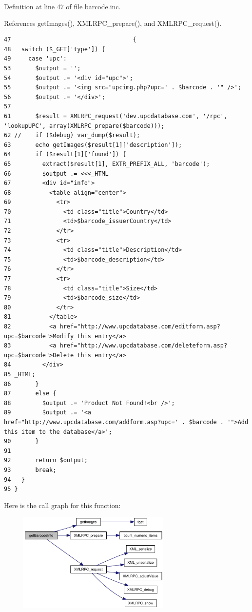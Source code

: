 Definition at line 47 of file barcode.inc.

References getImages(), XMLRPC\_\-prepare(), and XMLRPC\_\-request().

\begin{Code}\begin{verbatim}47                                   {
48   switch ($_GET['type']) {
49     case 'upc':
53       $output = '';
54       $output .= '<div id="upc">';
55       $output .= '<img src="upcimg.php?upc=' . $barcode . '" />';
56       $output .= '</div>';
57 
61       $result = XMLRPC_request('dev.upcdatabase.com', '/rpc', 'lookupUPC', array(XMLRPC_prepare($barcode)));
62 //    if ($debug) var_dump($result);
63       echo getImages($result[1]['description']);
64       if ($result[1]['found']) {
65         extract($result[1], EXTR_PREFIX_ALL, 'barcode');
66         $output .= <<<_HTML
67         <div id="info">
68           <table align="center">
69             <tr>
70               <td class="title">Country</td>
71               <td>$barcode_issuerCountry</td>
72             </tr>
73             <tr>
74               <td class="title">Description</td>
75               <td>$barcode_description</td>
76             </tr>
77             <tr>
78               <td class="title">Size</td>
79               <td>$barcode_size</td>
80             </tr>
81           </table>
82           <a href="http://www.upcdatabase.com/editform.asp?upc=$barcode">Modify this entry</a>
83           <a href="http://www.upcdatabase.com/deleteform.asp?upc=$barcode">Delete this entry</a>
84         </div>
85 _HTML;
86       }
87       else {
88         $output .= 'Product Not Found!<br />';
89         $output .= '<a href="http://www.upcdatabase.com/addform.asp?upc=' . $barcode . '">Add this item to the database</a>';
90       }
91 
92       return $output;
93       break;
94   }
95 }\end{verbatim}
\end{Code}




Here is the call graph for this function:\nopagebreak
\begin{figure}[H]
\begin{center}
\leavevmode
\includegraphics[width=215pt]{barcode_8inc_e10c37e4f9f9b7c6617a388351a27c99_cgraph}
\end{center}
\end{figure}
